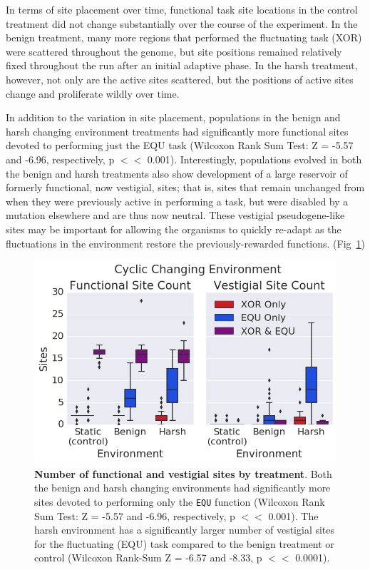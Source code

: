 \documentclass[PhD]{msu-thesis}
\begin{document}
In terms of site placement over time, functional task site locations in the control treatment did not change substantially over the course of the experiment. In the benign treatment, many more regions that performed the fluctuating task (XOR) were scattered throughout the genome, but site positions remained relatively fixed throughout the run after an initial adaptive phase. In the harsh treatment, however, not only are the active sites scattered, but the positions of active sites change and proliferate wildly over time.

In addition to the variation in site placement, populations in the benign and harsh changing environment treatments had significantly more functional sites devoted to performing just the EQU task (Wilcoxon Rank Sum Test: Z = -5.57 and -6.96, respectively, p $<<$ 0.001).
Interestingly, populations evolved in both the benign and harsh treatments also show development of a large reservoir of formerly functional, now vestigial, sites; that is, sites that remain unchanged from when they were previously active in performing a task, but were disabled by a mutation elsewhere and are thus now neutral. These vestigial pseudogene-like sites may be important for allowing the organisms to quickly re-adapt as the fluctuations in the environment restore the previously-rewarded functions. (Fig~\ref{fig:CCE_func_vestigial})

	\begin{figure}[!h]
	\includegraphics[trim={0 0 0 0}, clip, width=0.75\columnwidth]{figures/CE/CCE_func_vest__box.png}
	\caption{\textbf{Number of functional and vestigial sites by treatment}. Both the benign and harsh changing environments had significantly more sites devoted to performing only the \texttt{EQU} function (Wilcoxon Rank Sum Test: Z = -5.57 and -6.96, respectively, p $<<$ 0.001). The harsh environment has a significantly larger number of vestigial sites for the fluctuating (EQU) task compared to the benign treatment or control (Wilcoxon Rank-Sum Z = -6.57 and -8.33, p $<<$ 0.0001).
	}
	\label{fig:CCE_func_vestigial} %
	\end{figure}
\end{document}
